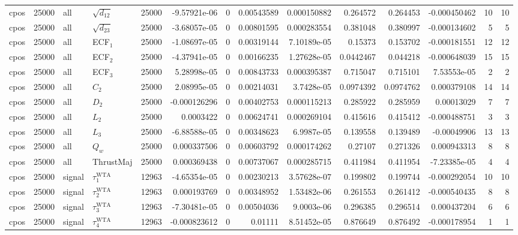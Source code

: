 \begin{landscape}
\begin{longtable}{llll r rrrr rr r rr}
cpos & 25000 & all & $\sqrt{d_{12}}$ & 25000 & -9.57921e-06 & 0 & 0.00543589 & 0.000150882 & 0.264572 & 0.264453 & -0.000450462 & 10 & 10 \\
cpos & 25000 & all & $\sqrt{d_{23}}$ & 25000 & -3.68057e-05 & 0 & 0.00801595 & 0.000283554 & 0.381048 & 0.380997 & -0.000134602 & 5 & 5 \\
cpos & 25000 & all & ECF$_1$ & 25000 & -1.08697e-05 & 0 & 0.00319144 & 7.10189e-05 & 0.15373 & 0.153702 & -0.000181551 & 12 & 12 \\
cpos & 25000 & all & ECF$_2$ & 25000 & -4.37941e-05 & 0 & 0.00166235 & 1.27628e-05 & 0.0442467 & 0.044218 & -0.000648039 & 15 & 15 \\
cpos & 25000 & all & ECF$_3$ & 25000 & 5.28998e-05 & 0 & 0.00843733 & 0.000395387 & 0.715047 & 0.715101 & 7.53553e-05 & 2 & 2 \\
cpos & 25000 & all & $C_2$ & 25000 & 2.08995e-05 & 0 & 0.00214031 & 3.7428e-05 & 0.0974392 & 0.0974762 & 0.000379108 & 14 & 14 \\
cpos & 25000 & all & $D_2$ & 25000 & -0.000126296 & 0 & 0.00402753 & 0.000115213 & 0.285922 & 0.285959 & 0.00013029 & 7 & 7 \\
cpos & 25000 & all & $L_2$ & 25000 & 0.0003422 & 0 & 0.00624741 & 0.000269104 & 0.415616 & 0.415412 & -0.000488751 & 3 & 3 \\
cpos & 25000 & all & $L_3$ & 25000 & -6.88588e-05 & 0 & 0.00348623 & 6.9987e-05 & 0.139558 & 0.139489 & -0.00049906 & 13 & 13 \\
cpos & 25000 & all & $Q_w$ & 25000 & 0.000337506 & 0 & 0.00603792 & 0.000174262 & 0.27107 & 0.271326 & 0.000943313 & 8 & 8 \\
cpos & 25000 & all & ThrustMaj & 25000 & 0.000369438 & 0 & 0.00737067 & 0.000285715 & 0.411984 & 0.411954 & -7.23385e-05 & 4 & 4 \\
cpos & 25000 & signal & $\tau_1^{\mathrm{WTA}}$ & 12963 & -4.65354e-05 & 0 & 0.00230213 & 3.57628e-07 & 0.199802 & 0.199744 & -0.000292054 & 10 & 10 \\
cpos & 25000 & signal & $\tau_2^{\mathrm{WTA}}$ & 12963 & 0.000193769 & 0 & 0.00348952 & 1.53482e-06 & 0.261553 & 0.261412 & -0.000540435 & 8 & 8 \\
cpos & 25000 & signal & $\tau_3^{\mathrm{WTA}}$ & 12963 & -7.30481e-05 & 0 & 0.00504036 & 9.0003e-06 & 0.296385 & 0.296514 & 0.000437204 & 6 & 6 \\
cpos & 25000 & signal & $\tau_4^{\mathrm{WTA}}$ & 12963 & -0.000823612 & 0 & 0.01111 & 8.51452e-05 & 0.876649 & 0.876492 & -0.000178954 & 1 & 1 \\

\end{longtable}
\end{landscape}
